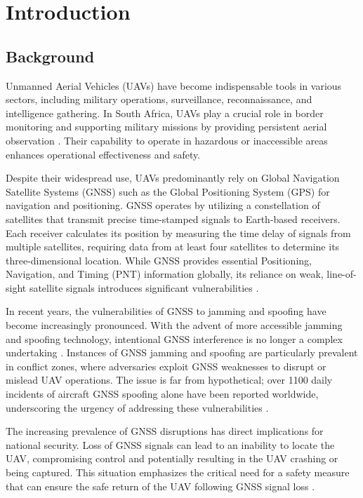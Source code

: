 
\chapter{Introduction}
\label{chap:introduction}

\vspace{-1.2cm}



\section{Background}


Unmanned Aerial Vehicles (UAVs) have become indispensable tools in various sectors, including military operations, surveillance, reconnaissance, and intelligence gathering. In South Africa, UAVs play a crucial role in border monitoring and supporting military missions by providing persistent aerial observation \cite{Weiss2024}. Their capability to operate in hazardous or inaccessible areas enhances operational effectiveness and safety.

Despite their widespread use, UAVs predominantly rely on Global Navigation Satellite Systems (GNSS) such as the Global Positioning System (GPS) for navigation and positioning. GNSS operates by utilizing a constellation of satellites that transmit precise time-stamped signals to Earth-based receivers. Each receiver calculates its position by measuring the time delay of signals from multiple satellites, requiring data from at least four satellites to determine its three-dimensional location. While GNSS provides essential Positioning, Navigation, and Timing (PNT) information globally, its reliance on weak, line-of-sight satellite signals introduces significant vulnerabilities \cite{geotab2024gps}.

In recent years, the vulnerabilities of GNSS to jamming and spoofing have become increasingly pronounced. With the advent of more accessible jamming and spoofing technology, intentional GNSS interference is no longer a complex undertaking \cite{khalil2024gnss}. Instances of GNSS jamming and spoofing are particularly prevalent in conflict zones, where adversaries exploit GNSS weaknesses to disrupt or mislead UAV operations. The issue is far from hypothetical; over 1100 daily incidents of aircraft GNSS spoofing alone have been reported worldwide, underscoring the urgency of addressing these vulnerabilities \cite{khalil2024gnss}.

The increasing prevalence of GNSS disruptions has direct implications for national security. Loss of GNSS signals can lead to an inability to locate the UAV, compromising control and potentially resulting in the UAV crashing or being captured. This situation emphasizes the critical need for a safety measure that can ensure the safe return of the UAV following GNSS signal loss \cite{geotab2024gps}.

